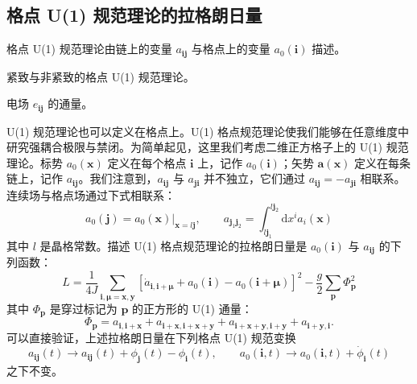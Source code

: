 \subsection{格点 U(1) 规范理论的拉格朗日量}

\begin{keypoints}
\item 格点 U(1) 规范理论由链上的变量 $a_{\pmb{i}\pmb{j}}$ 与格点上的变量 $a_{0}(\pmb{i})$ 描述。
\item 紧致与非紧致的格点 U(1) 规范理论。
\item 电场 $e_{\pmb{i}\pmb{j}}$ 的通量。
\end{keypoints}

U(1) 规范理论也可以定义在格点上。U(1) 格点规范理论使我们能够在任意维度中研究强耦合极限与禁闭。为简单起见，这里我们考虑二维正方格子上的 U(1) 规范理论。标势 $a_{0}(\pmb{x})$ 定义在每个格点 $\pmb{i}$ 上，记作 $a_{0}(\pmb{i})$；矢势 $\pmb{a}(\pmb{x})$ 定义在每条链上，记作 $a_{\pmb{i}\pmb{j}}$。我们注意到，$a_{\pmb{i}\pmb{j}}$ 与 $a_{\pmb{j}\pmb{i}}$ 并不独立，它们通过 $a_{\pmb{i}\pmb{j}}=-a_{\pmb{j}\pmb{i}}$ 相联系。连续场与格点场通过下式相联系：
\begin{equation*}
a_{0}(\pmb{j})=a_{0}(\pmb{x})|_{\pmb{x}=l\pmb{j}}, \qquad a_{\pmb{j}_{1}\pmb{j}_{2}}=\int_{l\pmb{j}_{1}}^{l\pmb{j}_{2}}\mathrm{d}x^{i}a_{i}(\pmb{x}) \tag{6.4.1}
\end{equation*}
其中 $l$ 是晶格常数。描述 U(1) 格点规范理论的拉格朗日量是 $a_{0}(\pmb{i})$ 与 $a_{\pmb{i}\pmb{j}}$ 的下列函数：
\begin{equation*}
L=\frac{1}{4J}\sum_{\pmb{i},\pmb{\mu}=\pmb{x},\pmb{y}}\left[\dot{a}_{\pmb{i},\pmb{i}+\pmb{\mu}}+a_{0}(\pmb{i})-a_{0}(\pmb{i}+\pmb{\mu})\right]^{2}-\frac{g}{2}\sum_{\pmb{p}}\Phi_{\pmb{p}}^{2} \tag{6.4.2}
\end{equation*}
其中 $\Phi_{\pmb{p}}$ 是穿过标记为 $\pmb{p}$ 的正方形的 U(1) 通量：
\begin{equation*}
\Phi_{\pmb{p}}=a_{\pmb{i},\pmb{i}+\pmb{x}}+a_{\pmb{i}+\pmb{x},\pmb{i}+\pmb{x}+\pmb{y}}+a_{\pmb{i}+\pmb{x}+\pmb{y},\pmb{i}+\pmb{y}}+a_{\pmb{i}+\pmb{y},\pmb{i}}. \tag{6.4.3}
\end{equation*}
可以直接验证，上述拉格朗日量在下列格点 U(1) 规范变换
\begin{equation*}
a_{\pmb{i}\pmb{j}}(t)\rightarrow a_{\pmb{i}\pmb{j}}(t)+\phi_{\pmb{j}}(t)-\phi_{\pmb{i}}(t), \qquad a_{0}(\pmb{i},t)\rightarrow a_{0}(\pmb{i},t)+\dot{\phi}_{\pmb{i}}(t) \tag{6.4.4}
\end{equation*}
之下不变。

